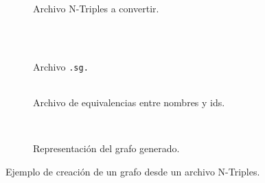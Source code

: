 \begin{figure}[t]
  \centering
  \begin{subfigure}[b]{\textwidth}
    \centering
    \begin{tabular}{c}
      
    \end{tabular}
    \caption{Archivo N-Triples a convertir.}
    \label{fig:nt:orig}
  \end{subfigure}
  \\[0.5cm]
  \begin{subfigure}[b]{.25\textwidth}
    \centering
    \begin{tabular}{c}
      
    \end{tabular}
    \caption{Archivo \tt{.sg}.}
    \label{fig:nt:sg}
  \end{subfigure}
  \begin{subfigure}[b]{.70\textwidth}
    \centering
    \begin{tabular}{c}
      
    \end{tabular}
    \caption{Archivo de equivalencias entre nombres y ids.}
    \label{fig:nt:names}
  \end{subfigure}
  \\[0.5cm]
  \begin{subfigure}[b]{\textwidth}
    \centering
    \caption{Representación del grafo generado.}
    \label{fig:nt:graph}
  \end{subfigure}

  \caption{Ejemplo de creación de un grafo desde un archivo
  N-Triples.}\label{fig:nt-to-graph}
\end{figure}
